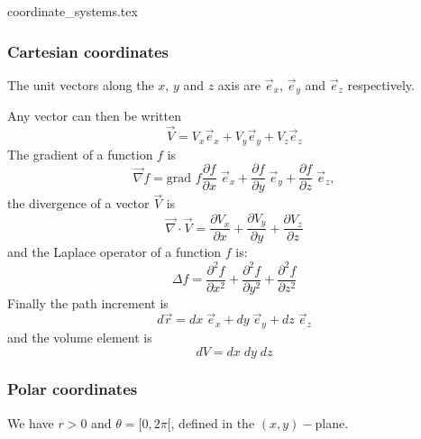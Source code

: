 \begin{flushright} {\tiny {\color{gray} coordinate\_systems.tex}} \end{flushright}

\subsubsection{Cartesian coordinates}

The unit vectors along the $x$, $y$ and $z$ axis are 
$\vec{e}_x$, $\vec{e}_y$ and $\vec{e}_z$ respectively.



\noindent Any vector can then be written
\[
{\vec V}  = V_x {\vec e}_x  + V_y {\vec e}_y + V_z \vec{e}_z
\]
The gradient of a function $f$ is 
\[
\vec{\nabla} f= \text{grad }f 
\frac{\partial f}{\partial x}\; \vec{e}_x +
\frac{\partial f}{\partial y}\; \vec{e}_y +
\frac{\partial f}{\partial z}\; \vec{e}_z,
\]
the divergence of a vector $\vec{V}$ is
\[
\vec{\nabla}\cdot \vec{V} = 
\frac{\partial V_x}{\partial x}+
\frac{\partial V_y}{\partial y}+
\frac{\partial V_z}{\partial z}
\]
and the Laplace operator of a function $f$ is:
\[
\Delta f = 
\frac{\partial^2 f}{\partial x^2} + 
\frac{\partial^2 f}{\partial y^2} + 
\frac{\partial^2 f}{\partial z^2}  
\]
Finally the path increment is
\[
d\vec{r} = dx \; {\vec e}_x  + dy\; {\vec e}_y + dz \; \vec{e}_z
\]
and the volume element is 
\[
dV=dx\; dy \; dz
\]

\subsubsection{Polar coordinates}

We have $r>0$ and $\theta=[0,2\pi[$, defined in the $(x,y)-$plane.



